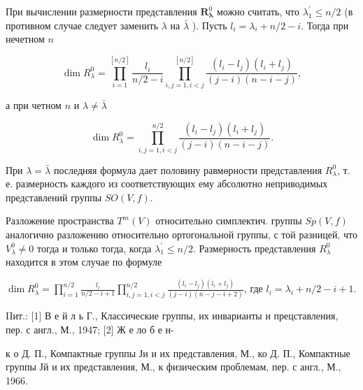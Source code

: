 \documentclass[10pt]{article}
\begin{document}
При вычислении размерности представления $\boldsymbol{R}_{\boldsymbol{\lambda}}^{0}$ можно считать, что $\lambda_{1}^{\prime} \leqslant n / 2$ (в противном случае следует заменить $\lambda$ на $\bar{\lambda}$ ). Пусть $l_{i}=\lambda_{i}+n / 2-i$. Тогда при нечетном $n$



\[

\operatorname{dim} R_{\lambda}^{0}=\prod_{i=1}^{[n / 2]} \frac{l_{i}}{n / 2-i} \prod_{i, j=1, i<j}^{[n / 2]} \frac{\left(l_{i}-l_{j}\right)\left(l_{i}+l_{j}\right)}{(j-i)(n-i-j)},

\]



а при четном $n$ и $\lambda \neq \bar{\lambda}$



\[

\operatorname{dim} R_{\lambda}^{0}=\prod_{i, j=1, i<j}^{n / 2} \frac{\left(l_{i}-l_{j}\right)\left(l_{i}+l_{j}\right)}{(j-i)(n-i-j)} .

\]



При $\lambda=\bar{\lambda}$ последняя формула дает половину равмөрности представления $R_{\lambda}^{0}$, т. е. размерность каждого из соответствующих ему абсолютно неприводимых представлений группы $S O(V, f)$.



Разложение пространства $T^{m}(V)$ относительно симплектич. группы $S p(V, f)$ аналогично разложению относительно ортогональной группы, с той разницей, что $V_{\lambda}^{0} \neq 0$ тогда и только тогда, когда $\lambda_{1}^{\prime} \leqslant n / 2$. Размерность представления $R_{\lambda}^{0}$ находится в этом случае по формуле



$\operatorname{dim} R_{\lambda}^{0}=\prod_{i=1}^{n / 2} \frac{l_{i}}{n / 2-i+1} \prod_{i, j=1, i<j}^{n / 2} \frac{\left(l_{i}-l_{j}\right)\left(l_{i}+l_{j}\right)}{(j-i)(n-j-i+2)}$, где $l_{i}=\lambda_{i}+n / 2-i+1$.



IIит.: [1] В е й л ь Г., Классические группы, их инварианты и прецставления, пер. с англ., М., 1947; [2] Ж е ло б е н-

к о Д. П., Компактные группы Ји и их представления, М., ко Д. П., Компактные группы Јй и их представления, М., к физическим проблемам, пер. с англ., М., 1966.
\end{document}
